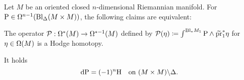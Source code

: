 \documentclass[\MainFolder/Text.tex]{subfiles}
\begin{document}
\begin{Proposition} \label{Prop:GKer}
Let $M$ be an oriented closed $n$-dimensional Riemannian manifold.
For $\mathrm{P} \in \Omega^{n-1} (\mathrm{Bl}_\Delta(M\times M))$,  the following claims are equivalent:
\begin{PlainList} 
\item The operator $\mathcal{P}: \Omega^*(M) \rightarrow \Omega^{*-1}(M)$ defined by $\mathcal{P}(\eta) \coloneqq \int^{\mathrm{Bl}_* M_1} \mathrm{P} \wedge \widetilde{\operatorname{\mathrm{pr}}}_1^*\eta$ for $\eta\in \Omega(M)$ is a Hodge homotopy.
\item It holds \begin{equation} \label{Eq:GKer}
 \mathrm{d} \mathrm{P} = (-1)^{n} \mathrm{H}\quad\text{on }(M\times M)\backslash \Delta.
\end{equation} 
\end{PlainList}
\end{Proposition}
%
\end{document}
